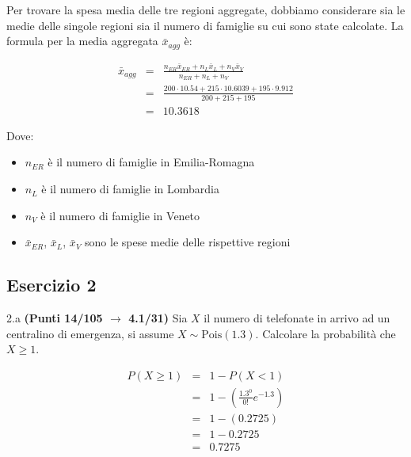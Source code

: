 \documentclass[
  11pt,
]{book}
\providecommand{\tightlist}{%
  \setlength{\itemsep}{0pt}\setlength{\parskip}{0pt}}
\theoremstyle{mytheoremstyle}
\theoremstyle{mydefstyle}
\newenvironment{sol}
  {
  \begin{tcolorbox}[enhanced,breakable,arc=0.1mm,boxrule=1pt,colback=white,colframe=iblue,
  title=\bf \fontfamily{lmss}\selectfont \hspace{.5 cm} Soluzione,drop fuzzy shadow]

}{
\end{tcolorbox}
  }
\begin{document}
\begin{sol}

Per trovare la spesa media delle tre regioni aggregate, dobbiamo considerare sia le medie delle singole regioni sia il numero di famiglie su cui sono state calcolate. La formula per la media aggregata \(\bar{x}_{agg}\) è:

\begin{eqnarray*}
\bar{x}_{agg}    &=&  \frac{n_{ER} \bar{x}_{ER} + n_{L} \bar{x}_{L} + n_{V} \bar{x}_{V}}{n_{ER} + n_{L} + n_{V}}\\
&=& \frac{200\cdot10.54+215\cdot10.6039+195\cdot9.912}{200+215+195}\\
&=& 10.3618
\end{eqnarray*}

Dove:

\begin{itemize}
\tightlist
\item
  \(n_{ER}\) è il numero di famiglie in Emilia-Romagna
\item
  \(n_{L}\) è il numero di famiglie in Lombardia
\item
  \(n_{V}\) è il numero di famiglie in Veneto
\item
  \(\bar{x}_{ER}\), \(\bar{x}_{L}\), \(\bar{x}_{V}\) sono le spese medie delle rispettive regioni
\end{itemize}

\end{sol}

\subsection{Esercizio 2}\label{esercizio-2-41}

2.a \textbf{(Punti 14/105 \(\rightarrow\) 4.1/31)} Sia \(X\) il numero di telefonate in arrivo ad un centralino di emergenza, si assume \(X\sim\text{Pois}(1.3)\). Calcolare la probabilità che \(X\geq 1\).

\begin{sol}
\begin{eqnarray*}
   P( X \geq 1 ) &=& 1-P( X < 1 ) \\                 &=& 1-\left( \frac{ 1.3 ^{ 0 }}{ 0 !}e^{- 1.3 } \right)\\                 &=& 1-( 0.2725 )\\                 &=& 1- 0.2725 \\                 &=&   0.7275 
\end{eqnarray*}

\end{sol}
\end{document}
